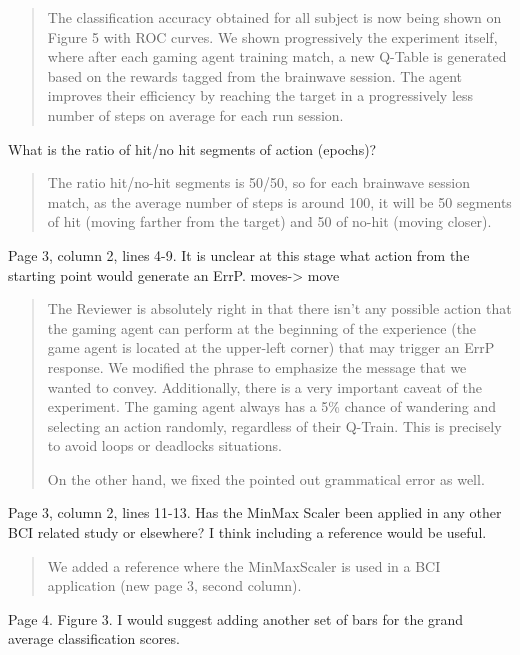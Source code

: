 \documentclass[journal,onecolumn,12pt]{IEEEtran}
\begin{document}
\begin{quotation}
{\color{blue}
The classification accuracy obtained for all subject is now being shown on Figure 5 with ROC curves.  We shown progressively the experiment itself, where after each gaming agent training match, a new Q-Table is generated based on the rewards tagged from the brainwave session.  The agent improves their efficiency by reaching the target in a progressively less number of steps on average for each run session.
}
\end{quotation}


What is the ratio of hit/no hit segments of action (epochs)?


\begin{quotation}
{\color{blue}
The ratio hit/no-hit segments is 50/50, so for each brainwave session match, as the average number of steps is around 100, it will be 50 segments of hit (moving farther from the target) and 50 of no-hit (moving closer).  
}
\end{quotation}


Page 3, column 2, lines 4-9. It is unclear at this stage what action from the starting point would generate an ErrP.
moves-> move

\begin{quotation}
{\color{blue}
The Reviewer is absolutely right in that there isn't any possible action that the gaming agent can perform at the beginning of the experience (the game agent is located at the upper-left corner) that may trigger an ErrP response.  We modified the phrase to emphasize the message that we wanted to convey.  Additionally, there is a very important caveat of the experiment. The gaming agent always has a 5\% chance of wandering and selecting an action randomly, regardless of their Q-Train.  This is precisely to avoid loops or deadlocks situations.

On the other hand, we fixed the pointed out grammatical error as well.
}
\end{quotation}


Page 3, column 2, lines 11-13. Has the MinMax Scaler been applied in any other BCI related study or elsewhere? I think including a reference would be useful.

\begin{quotation}
{\color{blue}
We added a reference where the MinMaxScaler is used in a BCI application (new page 3, second column).
}
\end{quotation}

Page 4. Figure 3. I would suggest adding another set of bars for the grand average classification scores.
\end{document}
